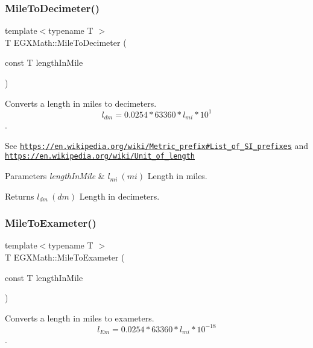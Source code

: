 \subsubsection{\texorpdfstring{Mile\+To\+Decimeter()}{MileToDecimeter()}}
{\footnotesize\ttfamily template$<$typename T $>$ \\
T E\+G\+X\+Math\+::\+Mile\+To\+Decimeter (\begin{DoxyParamCaption}\item[{const T}]{length\+In\+Mile }\end{DoxyParamCaption})}



Converts a length in miles to decimeters. \[ l_{dm}=0.0254 * 63360 * l_{mi} * 10^{1} \]. 

See \href{https://en.wikipedia.org/wiki/Metric_prefix#List_of_SI_prefixes}{\tt https\+://en.\+wikipedia.\+org/wiki/\+Metric\+\_\+prefix\#\+List\+\_\+of\+\_\+\+S\+I\+\_\+prefixes} and \href{https://en.wikipedia.org/wiki/Unit_of_length}{\tt https\+://en.\+wikipedia.\+org/wiki/\+Unit\+\_\+of\+\_\+length} 
\begin{DoxyParams}{Parameters}
{\em length\+In\+Mile} & $ l_{mi}\ (mi)$ Length in miles. \\
\hline
\end{DoxyParams}
\begin{DoxyReturn}{Returns}
$ l_{dm}\ (dm)$ Length in decimeters. 
\end{DoxyReturn}
\mbox{\label{group___e_g_x_math-_conversions-_length_conversions-_imperial-_mile-_s_i_gaae78957f56d8632cb0edff21dc4e371c}} 
\subsubsection{\texorpdfstring{Mile\+To\+Exameter()}{MileToExameter()}}
{\footnotesize\ttfamily template$<$typename T $>$ \\
T E\+G\+X\+Math\+::\+Mile\+To\+Exameter (\begin{DoxyParamCaption}\item[{const T}]{length\+In\+Mile }\end{DoxyParamCaption})}



Converts a length in miles to exameters. \[ l_{Em}=0.0254 * 63360 * l_{mi} * 10^{-18} \]. 

